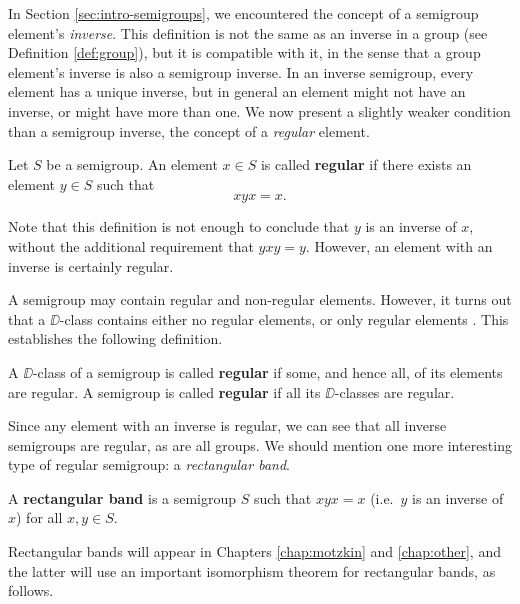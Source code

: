 In Section \ref{sec:intro-semigroups}, we encountered the concept of a semigroup
element's \textit{inverse}.  This definition is not the same as an inverse in a
group (see Definition \ref{def:group}), but it is compatible with it, in the
sense that a group element's inverse is also a semigroup inverse.  In an inverse
semigroup, every element has a unique inverse, but in general an element might
not have an inverse, or might have more than one.  We now present a slightly
weaker condition than a semigroup inverse, the concept of a \textit{regular}
element.

\begin{definition}
  \label{def:regular-element}
  Let $S$ be a semigroup.  An element $x \in S$ is called \textbf{regular} if
  there exists an element $y \in S$ such that
  $$xyx = x.$$
\end{definition}

Note that this definition is not enough to conclude that $y$ is an inverse of
$x$, without the additional requirement that $yxy = y$.  However, an element
with an inverse is certainly regular.

A semigroup may contain regular and non-regular elements.  However, it turns out
that a $\DD$-class contains either no regular elements, or only regular elements
\cite[Proposition 2.3.1]{howie}.  This establishes the following definition.

\begin{definition}
  \label{def:regular-semigroup}
  A $\DD$-class of a semigroup is called \textbf{regular} if some, and hence
  all, of its elements are regular.  A semigroup is called \textbf{regular} if
  all its $\DD$-classes are regular.
\end{definition}

Since any element with an inverse is regular, we can see that all inverse
semigroups are regular, as are all groups.  We should mention one more
interesting type of regular semigroup: a \textit{rectangular band}.

\begin{definition}
  \label{def:rectangular-band}
  A \textbf{rectangular band} is a semigroup $S$ such that $xyx=x$ (i.e.~$y$ is
  an inverse of $x$) for all $x,y \in S$.
\end{definition}

Rectangular bands will appear in Chapters \ref{chap:motzkin} and
\ref{chap:other}, and the latter will use an important isomorphism theorem for
rectangular bands, as follows.

